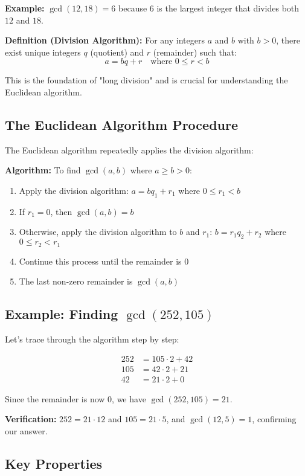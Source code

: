 \documentclass[12pt]{article}
\begin{document}
\textbf{Example:} $\gcd(12, 18) = 6$ because $6$ is the largest integer that divides both $12$ and $18$.

\textbf{Definition (Division Algorithm):} For any integers $a$ and $b$ with $b > 0$, there exist unique integers $q$ (quotient) and $r$ (remainder) such that:
$$a = bq + r \quad \text{where } 0 \leq r < b$$

This is the foundation of "long division" and is crucial for understanding the Euclidean algorithm.

\subsection{The Euclidean Algorithm Procedure}

The Euclidean algorithm repeatedly applies the division algorithm:

\textbf{Algorithm:} To find $\gcd(a, b)$ where $a \geq b > 0$:

\begin{enumerate}
\item Apply the division algorithm: $a = bq_1 + r_1$ where $0 \leq r_1 < b$
\item If $r_1 = 0$, then $\gcd(a, b) = b$
\item Otherwise, apply the division algorithm to $b$ and $r_1$: $b = r_1 q_2 + r_2$ where $0 \leq r_2 < r_1$
\item Continue this process until the remainder is $0$
\item The last non-zero remainder is $\gcd(a, b)$
\end{enumerate}

\subsection{Example: Finding $\gcd(252, 105)$}

Let's trace through the algorithm step by step:

\begin{align}
252 &= 105 \cdot 2 + 42 \\
105 &= 42 \cdot 2 + 21 \\
42 &= 21 \cdot 2 + 0
\end{align}

Since the remainder is now $0$, we have $\gcd(252, 105) = 21$.

\textbf{Verification:} $252 = 21 \cdot 12$ and $105 = 21 \cdot 5$, and $\gcd(12, 5) = 1$, confirming our answer.

\subsection{Key Properties}
\end{document}
